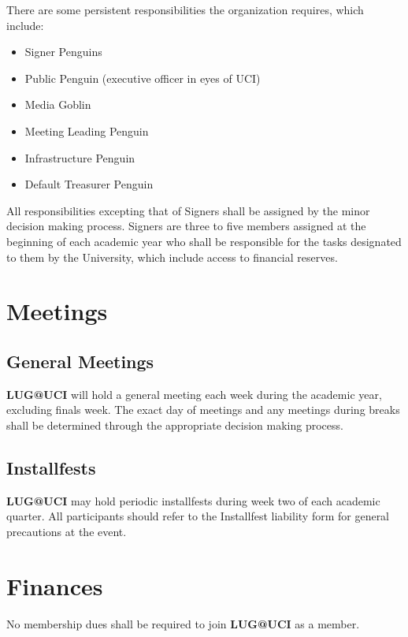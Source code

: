 \documentclass{article}
\begin{document}
There are some persistent responsibilities the organization requires, which 
include:

\begin{itemize}
	
    \item Signer Penguins
    \item Public Penguin (executive officer in eyes of UCI)
    \item Media Goblin
    \item Meeting Leading Penguin
    \item Infrastructure Penguin
    \item Default Treasurer Penguin
	
\end{itemize}

All responsibilities excepting that of Signers shall be assigned by the minor 
decision making process. Signers are three to five members assigned at the 
beginning of each academic year who shall be responsible for the tasks 
designated to them by the University, which include access to financial 
reserves.

\section{Meetings}

\subsection{General Meetings}

\textbf{LUG@UCI} will hold a general meeting each week during the academic year, 
excluding finals week. The exact day of meetings and any meetings during breaks 
shall be determined through the appropriate decision making process.

\subsection{Installfests}

\textbf{LUG@UCI} may hold periodic installfests during week two of each academic 
quarter. All participants should refer to the Installfest liability form for 
general precautions at the event.

\section{Finances}

No membership dues shall be required to join \textbf{LUG@UCI} as a member.
\end{document}
